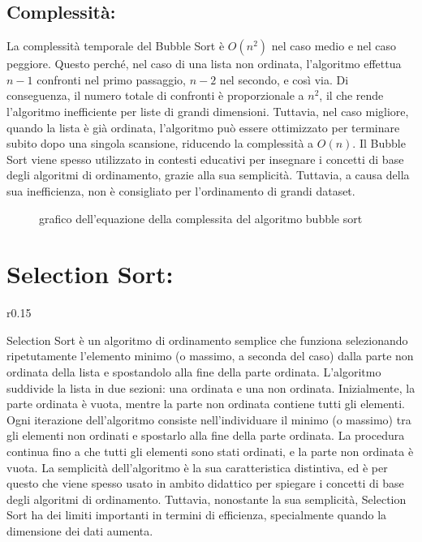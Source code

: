 \documentclass[a4paper]{article}
\begin{document}
\subsection{Complessità:}
La complessità temporale del Bubble Sort è \(O(n^2)\) nel caso medio e nel caso peggiore. Questo perché, nel caso di una lista non ordinata, l'algoritmo 
effettua \(n-1\) confronti nel primo passaggio, \(n-2\) nel secondo, e così via. Di conseguenza, il numero totale di confronti è proporzionale a \(n^2\), il che 
rende l'algoritmo inefficiente per liste di grandi dimensioni. Tuttavia, nel caso migliore, quando la lista è già ordinata, l'algoritmo può essere ottimizzato
per terminare subito dopo una singola scansione, riducendo la complessità a \(O(n)\).
Il Bubble Sort viene spesso utilizzato in contesti educativi per insegnare i concetti di base degli algoritmi di ordinamento, grazie alla sua semplicità. Tuttavia, 
a causa della sua inefficienza, non è consigliato per l'ordinamento di grandi dataset.
\begin{figure}[h]
    \caption{grafico dell'equazione della complessita del algoritmo bubble sort}
\end{figure}
\section{Selection Sort:}
\begin{wrapfigure}{r}{0.15\textwidth}
    \begin{center}
    \end{center}
\end{wrapfigure}
Selection Sort è un algoritmo di ordinamento semplice che funziona selezionando ripetutamente l'elemento minimo (o massimo, a seconda del caso) dalla
 parte non ordinata della lista e spostandolo alla fine della parte ordinata. L'algoritmo suddivide la lista in due sezioni: una ordinata e una non ordinata. 
 Inizialmente, la parte ordinata è vuota, mentre la parte non ordinata contiene tutti gli elementi. Ogni iterazione dell'algoritmo consiste nell'individuare 
 il minimo (o massimo) tra gli elementi non ordinati e spostarlo alla fine della parte ordinata. La procedura continua fino a che tutti gli elementi sono stati 
 ordinati, e la parte non ordinata è vuota.
La semplicità dell'algoritmo è la sua caratteristica distintiva, ed è per questo che viene spesso usato in ambito didattico per spiegare i concetti di base 
degli algoritmi di ordinamento. Tuttavia, nonostante la sua semplicità, Selection Sort ha dei limiti importanti in termini di efficienza, specialmente
quando la dimensione dei dati aumenta.
\end{document}

